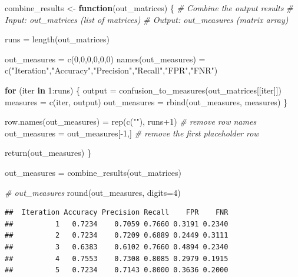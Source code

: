 \documentclass[
]{article}
\newenvironment{Shaded}{\begin{snugshade}}{\end{snugshade}}
\newcommand{\AttributeTok}[1]{\textcolor[rgb]{0.77,0.63,0.00}{#1}}
\newcommand{\CommentTok}[1]{\textcolor[rgb]{0.56,0.35,0.01}{\textit{#1}}}
\newcommand{\ControlFlowTok}[1]{\textcolor[rgb]{0.13,0.29,0.53}{\textbf{#1}}}
\newcommand{\DecValTok}[1]{\textcolor[rgb]{0.00,0.00,0.81}{#1}}
\newcommand{\FunctionTok}[1]{\textcolor[rgb]{0.00,0.00,0.00}{#1}}
\newcommand{\NormalTok}[1]{#1}
\newcommand{\OtherTok}[1]{\textcolor[rgb]{0.56,0.35,0.01}{#1}}
\newcommand{\SpecialCharTok}[1]{\textcolor[rgb]{0.00,0.00,0.00}{#1}}
\newcommand{\StringTok}[1]{\textcolor[rgb]{0.31,0.60,0.02}{#1}}
\begin{document}
\begin{Shaded}
\begin{Highlighting}[]
\NormalTok{combine\_results }\OtherTok{\textless{}{-}} \ControlFlowTok{function}\NormalTok{(out\_matrices) \{}
  \CommentTok{\# Combine the output results}
  \CommentTok{\# Input: out\_matrices (list of matrices)}
  \CommentTok{\# Output: out\_measures (matrix array)}
  
\NormalTok{  runs }\OtherTok{=} \FunctionTok{length}\NormalTok{(out\_matrices) }

\NormalTok{  out\_measures }\OtherTok{=} \FunctionTok{c}\NormalTok{(}\DecValTok{0}\NormalTok{,}\DecValTok{0}\NormalTok{,}\DecValTok{0}\NormalTok{,}\DecValTok{0}\NormalTok{,}\DecValTok{0}\NormalTok{,}\DecValTok{0}\NormalTok{)}
  \FunctionTok{names}\NormalTok{(out\_measures) }\OtherTok{=} \FunctionTok{c}\NormalTok{(}\StringTok{"Iteration"}\NormalTok{,}\StringTok{"Accuracy"}\NormalTok{,}\StringTok{"Precision"}\NormalTok{,}\StringTok{"Recall"}\NormalTok{,}\StringTok{"FPR"}\NormalTok{,}\StringTok{"FNR"}\NormalTok{)}
  
  \ControlFlowTok{for}\NormalTok{ (iter }\ControlFlowTok{in} \DecValTok{1}\SpecialCharTok{:}\NormalTok{runs) \{}
\NormalTok{    output }\OtherTok{=} \FunctionTok{confusion\_to\_measures}\NormalTok{(out\_matrices[[iter]])}
\NormalTok{    measures }\OtherTok{=} \FunctionTok{c}\NormalTok{(iter, output)}
\NormalTok{    out\_measures }\OtherTok{=} \FunctionTok{rbind}\NormalTok{(out\_measures, measures)}
\NormalTok{  \}}
  
  \FunctionTok{row.names}\NormalTok{(out\_measures) }\OtherTok{=} \FunctionTok{rep}\NormalTok{(}\FunctionTok{c}\NormalTok{(}\StringTok{""}\NormalTok{), runs}\SpecialCharTok{+}\DecValTok{1}\NormalTok{) }\CommentTok{\# remove row names}
\NormalTok{  out\_measures }\OtherTok{=}\NormalTok{ out\_measures[}\SpecialCharTok{{-}}\DecValTok{1}\NormalTok{,] }\CommentTok{\# remove the first placeholder row}
  
  \FunctionTok{return}\NormalTok{(out\_measures)}
\NormalTok{\}}

\NormalTok{out\_measures }\OtherTok{=} \FunctionTok{combine\_results}\NormalTok{(out\_matrices)}

\CommentTok{\# out\_measures}
\FunctionTok{round}\NormalTok{(out\_measures, }\AttributeTok{digits=}\DecValTok{4}\NormalTok{)}
\end{Highlighting}
\end{Shaded}

\begin{verbatim}
##  Iteration Accuracy Precision Recall    FPR    FNR
##          1   0.7234    0.7059 0.7660 0.3191 0.2340
##          2   0.7234    0.7209 0.6889 0.2449 0.3111
##          3   0.6383    0.6102 0.7660 0.4894 0.2340
##          4   0.7553    0.7308 0.8085 0.2979 0.1915
##          5   0.7234    0.7143 0.8000 0.3636 0.2000
\end{verbatim}
\end{document}
